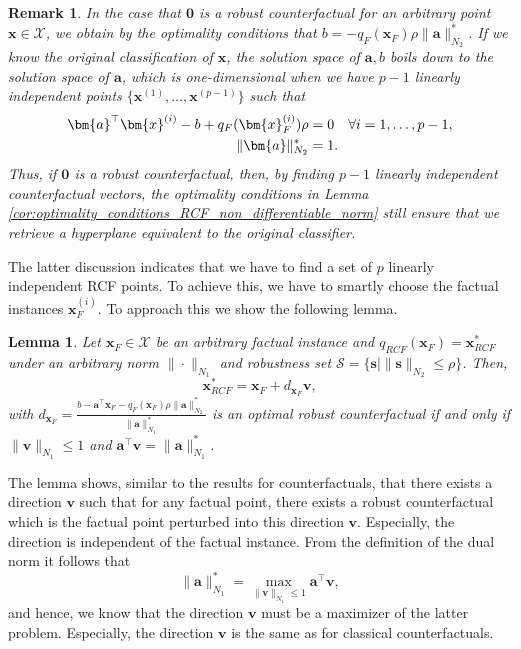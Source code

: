 \documentclass{article}
\newtheorem{lemma}[theorem]{Lemma}
\newtheorem{remark}[theorem]{Remark}
\begin{document}
\begin{remark}
In the case that $\bm{0}$ is a robust counterfactual for an arbitrary point $\bm{x}\in\mathcal{X}$, we obtain by the optimality conditions that $b = - q_F(\bm{x}_F)\rho\|\bm{a}\|_{N_2}^*$. If we know the original classification of $\bm{x}$, the solution space of $\bm{a},b$ boils down to the solution space of $\bm{a}$, which is one-dimensional when we have $p-1$ linearly independent points $\{\bm{x}^{(1)},\ldots, \bm{x}^{(p-1)}\}$ such that
\begin{align*}
\bm{a}^\top \bm{x}^{(i)}-b+ q_F(\bm{x}_F^{(i)})\rho  & = 0 \quad \forall i=1,\ldots, p-1,\\
\| \bm{a}\|^*_{N_2} & = 1.\notag
\end{align*}
% 
Thus, if $\bm{0}$ is a robust counterfactual, then, by finding $p-1$ linearly independent counterfactual vectors, the optimality conditions in Lemma \ref{cor:optimality_conditions_RCF_non_differentiable_norm} still ensure that we retrieve a hyperplane equivalent to the original classifier.    
\end{remark}

The latter discussion indicates that we have to find a set of $p$ linearly independent RCF points. To achieve this, we have to smartly choose the factual instances $\bm{x}_F^{(i)}$. To approach this we show the following lemma.
\begin{lemma}\label{lem:RCF_direction}
    Let $\bm{x}_F\in \mathcal X$ be an arbitrary factual instance and $q_{RCF}(\bm{x}_F) = \bm{x}_{RCF}^*$ under an arbitrary norm $ \| \cdot \|_{N_1}$ and robustness set $\mathcal S=\{ \bm{s}\mid \|\bm{s}\|_{N_2}\le \rho\}$. Then,
    \begin{equation*}\label{eq:RCF_direction}
        \bm{x}_{RCF}^*=\bm{x}_F+d_{\bm{x}_F}\bm{v},
    \end{equation*}
    with $d_{\bm{x}_F} = \frac{b-\bm{a}^{\top}\bm{x}_F- q_F(\bm{x}_F)\rho\|\bm{a}\|_{N_2}^*}{\|\bm{a}\|_{N_1}^*}$ is an optimal robust counterfactual if and only if $\|\bm{v}\|_{N_1}\leq 1$ and $\bm{a}^{\top}\bm{v} =\|\bm{a}\|_{N_1}^*$.
\end{lemma}

The lemma shows, similar to the results for counterfactuals, that there exists a direction $\bm{v}$ such that for any factual point, there exists a robust counterfactual which is the factual point perturbed into this direction $\bm{v}$. Especially, the direction is independent of the factual instance. From the definition of the dual norm it follows that
\[
\|\bm{a}\|^*_{N_1}  = \max_{\| \bm{v}\|_{N_1} \le 1} \bm{a}^\top \bm{v},
\]
and hence, we know that the direction $\bm{v}$ must be a maximizer of the latter problem. Especially, the direction $\bm{v}$ is the same as for classical counterfactuals.
\end{document}
